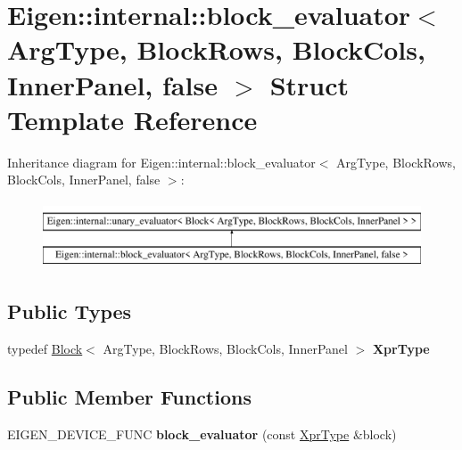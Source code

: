 \hypertarget{struct_eigen_1_1internal_1_1block__evaluator_3_01_arg_type_00_01_block_rows_00_01_block_cols_00_01_inner_panel_00_01false_01_4}{}\section{Eigen\+::internal\+::block\+\_\+evaluator$<$ Arg\+Type, Block\+Rows, Block\+Cols, Inner\+Panel, false $>$ Struct Template Reference}
\label{struct_eigen_1_1internal_1_1block__evaluator_3_01_arg_type_00_01_block_rows_00_01_block_cols_00_01_inner_panel_00_01false_01_4}
Inheritance diagram for Eigen\+::internal\+::block\+\_\+evaluator$<$ Arg\+Type, Block\+Rows, Block\+Cols, Inner\+Panel, false $>$\+:\begin{figure}[H]
\begin{center}
\leavevmode
\includegraphics[height=2.000000cm]{struct_eigen_1_1internal_1_1block__evaluator_3_01_arg_type_00_01_block_rows_00_01_block_cols_00_01_inner_panel_00_01false_01_4}
\end{center}
\end{figure}
\subsection*{Public Types}
\begin{DoxyCompactItemize}
\item 
\mbox{\label{struct_eigen_1_1internal_1_1block__evaluator_3_01_arg_type_00_01_block_rows_00_01_block_cols_00_01_inner_panel_00_01false_01_4_aace900a8b95db4b5bb32d001ed47046d}} 
typedef \mbox{\hyperlink{class_eigen_1_1_block}{Block}}$<$ Arg\+Type, Block\+Rows, Block\+Cols, Inner\+Panel $>$ {\bfseries Xpr\+Type}
\end{DoxyCompactItemize}
\subsection*{Public Member Functions}
\begin{DoxyCompactItemize}
\item 
\mbox{\label{struct_eigen_1_1internal_1_1block__evaluator_3_01_arg_type_00_01_block_rows_00_01_block_cols_00_01_inner_panel_00_01false_01_4_a60d48f1e854540b4482f08a2df683f01}} 
E\+I\+G\+E\+N\+\_\+\+D\+E\+V\+I\+C\+E\+\_\+\+F\+U\+NC {\bfseries block\+\_\+evaluator} (const \mbox{\hyperlink{class_eigen_1_1_block}{Xpr\+Type}} \&block)
\end{DoxyCompactItemize}


